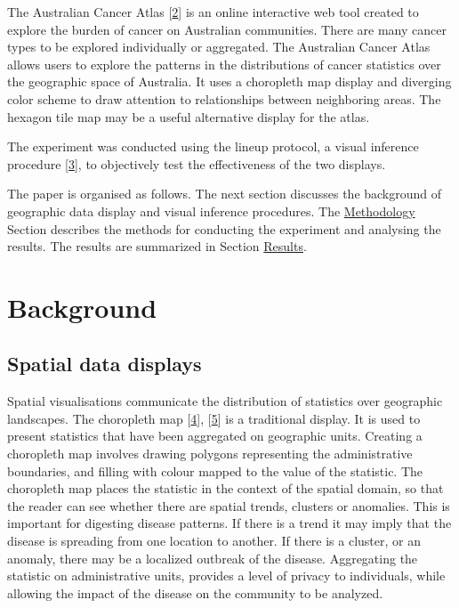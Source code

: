 \documentclass[conference,final,]{IEEEtran}
\begin{document}
The Australian Cancer Atlas {[}\protect\hyperlink{ref-atlas}{2}{]} is an online interactive web tool created to explore the burden of cancer on Australian communities. There are many cancer types to be explored individually or aggregated. The Australian Cancer Atlas allows users to explore the patterns in the distributions of cancer statistics over the geographic space of Australia. It uses a choropleth map display and diverging color scheme to draw attention to relationships between neighboring areas. The hexagon tile map may be a useful alternative display for the atlas.

The experiment was conducted using the lineup protocol, a visual inference procedure {[}\protect\hyperlink{ref-GIIV}{3}{]}, to objectively test the effectiveness of the two displays.

The paper is organised as follows. The next section discusses the background of geographic data display and visual inference procedures. The \protect\hyperlink{methodology}{Methodology} Section describes the methods for conducting the experiment and analysing the results. The results are summarized in Section \protect\hyperlink{results}{Results}.

\hypertarget{background}{%
\section{Background}\label{background}}

\hypertarget{spatial-data-displays}{%
\subsection{Spatial data displays}\label{spatial-data-displays}}

Spatial visualisations communicate the distribution of statistics over geographic landscapes. The choropleth map {[}\protect\hyperlink{ref-EI}{4}{]}, {[}\protect\hyperlink{ref-BCM}{5}{]} is a traditional display. It is used to present statistics that have been aggregated on geographic units. Creating a choropleth map involves drawing polygons representing the administrative boundaries, and filling with colour mapped to the value of the statistic. The choropleth map places the statistic in the context of the spatial domain, so that the reader can see whether there are spatial trends, clusters or anomalies. This is important for digesting disease patterns. If there is a trend it may imply that the disease is spreading from one location to another. If there is a cluster, or an anomaly, there may be a localized outbreak of the disease. Aggregating the statistic on administrative units, provides a level of privacy to individuals, while allowing the impact of the disease on the community to be analyzed.
\end{document}
